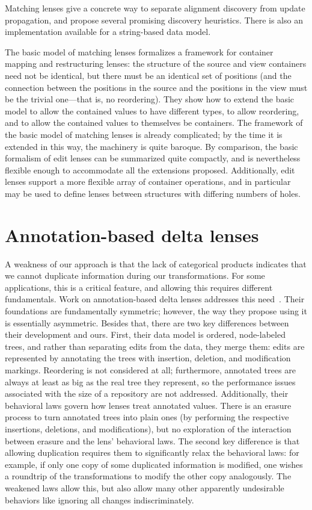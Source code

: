 Matching lenses give a concrete way to separate alignment discovery from
update propagation, and propose several promising discovery heuristics.
There is also an implementation available for a string-based data model.

The basic model of matching lenses formalizes a framework for container mapping and
restructuring lenses: the structure of the source and view containers need
not be identical, but there must be an identical set of positions (and the
connection between the positions in the source and the positions in the view
must be the trivial one---that is, no reordering). They show how to extend
the basic model to allow the contained values to have different types, to
allow reordering, and to allow the contained values to themselves be
containers. The framework of the basic model of matching lenses is already
complicated; by the time it is extended in this way, the machinery is quite
baroque. By comparison, the basic formalism of edit lenses can be summarized
quite compactly, and is nevertheless flexible enough to accommodate all the
extensions proposed. Additionally, edit lenses support a more flexible array
of container operations, and in particular may be used to define lenses
between structures with differing numbers of holes.

\section{Annotation-based delta lenses}
\label{sec:annotations}
A weakness of our approach is that the lack of categorical products
indicates that we cannot duplicate information during our transformations.
For some applications, this is a critical feature, and allowing this requires
different fundamentals. Work on annotation-based delta lenses addresses this
need~\cite{Hu04,HuEditor08,MuAlgebraic2004}. Their foundations are
fundamentally symmetric; however, the way they propose using it is
essentially asymmetric. Besides that, there are two key differences between
their development and ours. First, their data model is ordered, node-labeled
trees, and rather than separating edits from the data, they merge them:
edits are represented by annotating the trees with insertion, deletion, and
modification markings. Reordering is not considered at all; furthermore,
annotated trees are always at least as big as the real tree they represent,
so the performance issues associated with the size of a repository are not
addressed. Additionally, their behavioral laws govern
how lenses treat annotated values. There is an erasure process to turn
annotated trees into plain ones (by performing the respective insertions,
deletions, and modifications), but no exploration of the interaction between
erasure and the lens' behavioral laws. The second key difference is that
allowing duplication requires them to significantly relax the behavioral
laws: for example, if only one copy of some duplicated information is
modified, one wishes a roundtrip of the transformations to modify the other
copy analogously. The weakened laws allow this, but also allow many other
apparently undesirable behaviors like ignoring all changes indiscriminately.

